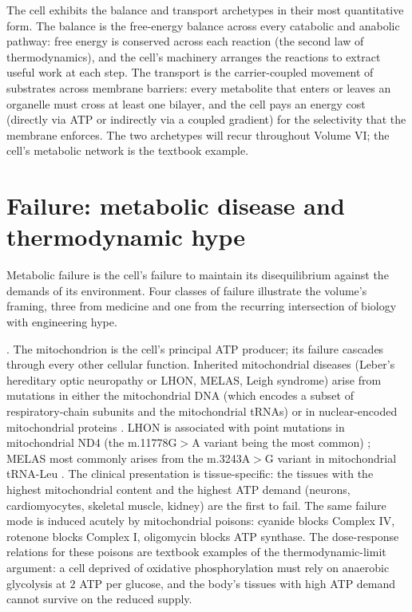\begin{archetype}
The cell exhibits the balance and transport archetypes in their most
quantitative form. The balance is the free-energy balance across every
catabolic and anabolic pathway: free energy is conserved across each
reaction (the second law of thermodynamics), and the cell's machinery
arranges the reactions to extract useful work at each step. The
transport is the carrier-coupled movement of substrates across
membrane barriers: every metabolite that enters or leaves an organelle
must cross at least one bilayer, and the cell pays an energy cost
(directly via ATP or indirectly via a coupled gradient) for the
selectivity that the membrane enforces. The two archetypes will
recur throughout Volume VI; the cell's metabolic network is the
textbook example.
\end{archetype}

\section{Failure: metabolic disease and thermodynamic hype}

Metabolic failure is the cell's failure to maintain its disequilibrium
against the demands of its environment. Four classes of failure
illustrate the volume's framing, three from medicine and one from
the recurring intersection of biology with engineering hype.

. The mitochondrion is the cell's
principal ATP producer; its failure cascades through every other
cellular function. Inherited mitochondrial diseases (Leber's hereditary
optic neuropathy or LHON, MELAS, Leigh syndrome) arise from mutations
in either the mitochondrial DNA (which encodes a subset of
respiratory-chain subunits and the mitochondrial tRNAs) or in
nuclear-encoded mitochondrial proteins \cite{paper:v6c02-wallace-1999}.
LHON is associated with point mutations in mitochondrial ND4 (the
m.11778G$>$A variant being the most common)
\cite{paper:v6c02-wallace-leber-1988}; MELAS most commonly arises from
the m.3243A$>$G variant in mitochondrial tRNA-Leu
\cite{paper:v6c02-goto-melas-1990}. The clinical presentation is
tissue-specific: the tissues with the highest mitochondrial content
and the highest ATP demand (neurons, cardiomyocytes, skeletal muscle,
kidney) are the first to fail. The same failure mode is induced
acutely by mitochondrial poisons: cyanide blocks Complex IV, rotenone
blocks Complex I, oligomycin blocks ATP synthase. The dose-response
relations for these poisons are textbook examples of the
thermodynamic-limit argument: a cell deprived of oxidative
phosphorylation must rely on anaerobic glycolysis at $2$ ATP per
glucose, and the body's tissues with high ATP demand cannot survive
on the reduced supply.

